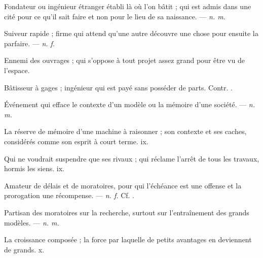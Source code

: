  Fondateur ou ingénieur étranger établi là où l'on bâtit ; qui est admis dans une cité pour ce qu'il sait faire et non pour le lieu de sa naissance. ---  \textit{n. m.}

 Suiveur rapide ; firme qui attend qu'une autre découvre une chose pour ensuite la parfaire. ---  \textit{n. f.}

 Ennemi des ouvrages ; qui s'oppose à tout projet assez grand pour être vu de l'espace.

 Bâtisseur à gages ; ingénieur qui est payé sans posséder de parts. Contr. .

 Événement qui efface le contexte d'un modèle ou la mémoire d'une société. ---  \textit{n. m.}

 La réserve de mémoire d'une machine à raisonner ; son contexte et ses caches, considérés comme son esprit à court terme.   ix.

 Qui ne voudrait suspendre que ses rivaux ; qui réclame l'arrêt de tous les travaux, hormis les siens.   ix.

 Amateur de délais et de moratoires, pour qui l'échéance est une offense et la prorogation une récompense. ---  \textit{n. f.} Cf. .

 Partisan des moratoires sur la recherche, surtout sur l'entraînement des grands modèles.   ---  \textit{n. m.}

 La croissance composée ; la force par laquelle de petits avantages en deviennent de grands.   x.

